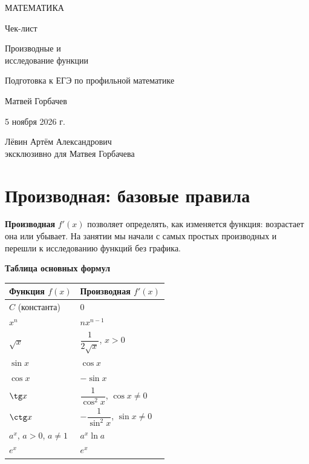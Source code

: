 \documentclass[a4paper,12pt]{article}
\newcommand{\idea}[1]{\textcolor{darkaccent}{\textbf{#1}}}
\begin{document}
\thispagestyle{empty}
\begin{center}
\vspace*{16mm}
{\large\color{darkaccent} МАТЕМАТИКА}\par
\vspace{22mm}
{\LARGE Чек-лист}\par
\vspace{15mm}
{\Large\color{accent} Производные и\\[4pt] исследование функции}\par
\vspace{20mm}
{\normalsize Подготовка к ЕГЭ по профильной математике}\par
\vfill
{\large Матвей Горбачев}\par
\vspace{13mm}
{\normalsize 5 ноября 2026 г.}\par
\vfill
{\small Лёвин Артём Александрович\\ эксклюзивно для Матвея Горбачева}\par
\vspace{15mm}
\vspace{6mm}
\end{center}
\clearpage
\section{Производная: базовые правила}
\textbf{Производная} $f'(x)$ позволяет определять, как изменяется функция: возрастает она или убывает. На занятии мы начали с самых простых производных и перешли к исследованию функций без графика.

\idea{Таблица основных формул}\par
\begin{center}
\renewcommand{\arraystretch}{1.42}
\begin{tabular}{@{}ll@{}}
\toprule
Функция $f(x)$ & Производная $f'(x)$\\
\midrule
$C$ (константа) & $0$\\
$x^n$ & $nx^{n-1}$\\
$\sqrt{x}$ & $\dfrac{1}{2\sqrt{x}}$, $x>0$\\
$\sin x$ & $\cos x$\\
$\cos x$ & $-\sin x$\\
$\tg x$ & $\dfrac{1}{\cos^2 x}$, $\cos x\ne0$\\
$\ctg x$ & $-\dfrac{1}{\sin^2 x}$, $\sin x\ne0$\\
$a^x$, $a>0$, $a\ne1$ & $a^x\ln a$\\
$e^x$ & $e^x$\\
\bottomrule
\end{tabular}
\end{center}
\end{document}
